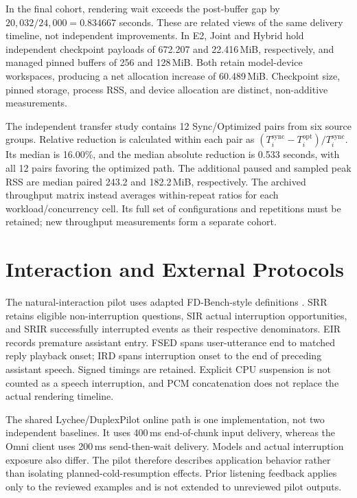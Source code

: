 In the final cohort, rendering wait exceeds the post-buffer gap
by $20{,}032/24{,}000=0.834667$ seconds.
These are related views of the same delivery timeline, not
independent improvements.
In E2, Joint and Hybrid hold independent checkpoint payloads of
672.207 and 22.416\,MiB, respectively, and managed pinned buffers
of 256 and 128\,MiB.
Both retain model-device workspaces, producing a net allocation
increase of 60.489\,MiB.
Checkpoint size, pinned storage, process RSS, and device allocation
are distinct, non-additive measurements.

The independent transfer study contains 12 Sync/Optimized pairs
from six source groups.
Relative reduction is calculated within each pair as
$(T_i^{\mathrm{sync}}-T_i^{\mathrm{opt}})/T_i^{\mathrm{sync}}$.
Its median is 16.00\%, and the median absolute reduction is
0.533 seconds, with all 12 pairs favoring the optimized path.
The additional paused and sampled peak RSS are median paired
243.2 and 182.2\,MiB, respectively.
The archived throughput matrix instead averages within-repeat
ratios for each workload/concurrency cell.
Its full set of configurations and repetitions must be retained;
new throughput measurements form a separate cohort.


\section{Interaction and External Protocols}
\label{app:interaction}

The natural-interaction pilot uses adapted FD-Bench-style definitions
\citep{fdbench2025}.
SRR retains eligible non-interruption questions, SIR actual
interruption opportunities, and SRIR successfully interrupted events
as their respective denominators.
EIR records premature assistant entry.
FSED spans user-utterance end to matched reply playback onset;
IRD spans interruption onset to the end of preceding assistant speech.
Signed timings are retained.
Explicit CPU suspension is not counted as a speech interruption,
and PCM concatenation does not replace the actual rendering timeline.

The shared Lychee/DuplexPilot online path is one implementation,
not two independent baselines.
It uses 400\,ms end-of-chunk input delivery, whereas the Omni client
uses 200\,ms send-then-wait delivery.
Models and actual interruption exposure also differ.
The pilot therefore describes application behavior rather than
isolating planned-cold-resumption effects.
Prior listening feedback applies only to the reviewed examples and
is not extended to unreviewed pilot outputs.

